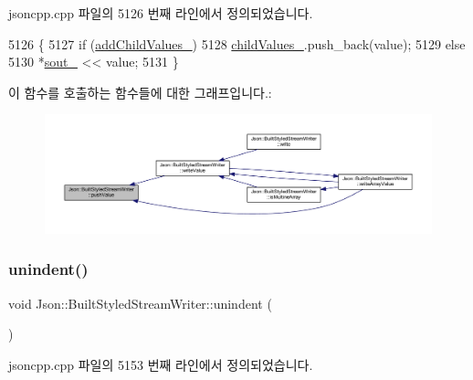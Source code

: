 jsoncpp.\+cpp 파일의 5126 번째 라인에서 정의되었습니다.


\begin{DoxyCode}
5126                                                                    \{
5127   \textcolor{keywordflow}{if} (\hyperlink{struct_json_1_1_built_styled_stream_writer_abed9cc31da503b48798e7cea68c42e16}{addChildValues\_})
5128     \hyperlink{struct_json_1_1_built_styled_stream_writer_a47d562d7874c5b1e68995bd62f575792}{childValues\_}.push\_back(value);
5129   \textcolor{keywordflow}{else}
5130     *\hyperlink{class_json_1_1_stream_writer_a4f5603d4228a9fa46a42cb44e5234d9b}{sout\_} << value;
5131 \}
\end{DoxyCode}
이 함수를 호출하는 함수들에 대한 그래프입니다.\+:\nopagebreak
\begin{figure}[H]
\begin{center}
\leavevmode
\includegraphics[width=350pt]{struct_json_1_1_built_styled_stream_writer_a91e8535508412eea04d77c0cafdf15aa_icgraph}
\end{center}
\end{figure}
\mbox{\label{struct_json_1_1_built_styled_stream_writer_a0da6c6f603e00c8c6e38af553edd8c55}} 
\subsubsection{\texorpdfstring{unindent()}{unindent()}}
{\footnotesize\ttfamily void Json\+::\+Built\+Styled\+Stream\+Writer\+::unindent (\begin{DoxyParamCaption}{ }\end{DoxyParamCaption})\hspace{0.3cm}{\ttfamily [private]}}



jsoncpp.\+cpp 파일의 5153 번째 라인에서 정의되었습니다.


